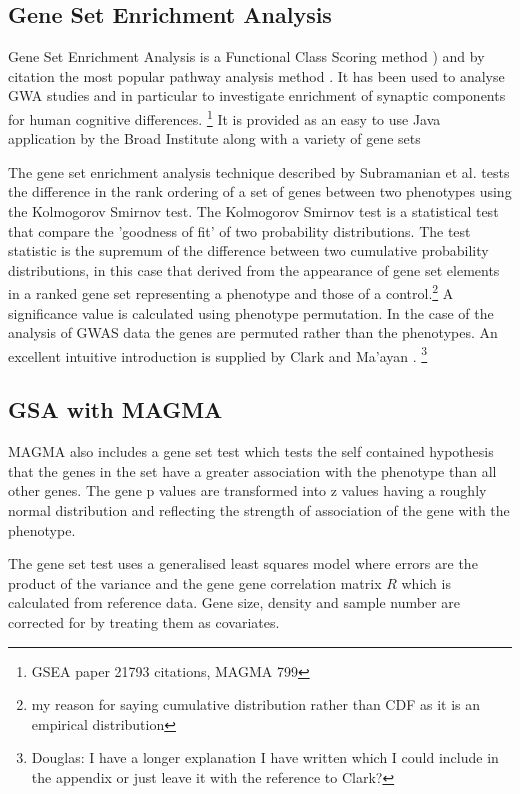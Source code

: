\subsection{Gene Set Enrichment Analysis}
\label{sec:Gene set enrichment analysis}
 Gene Set Enrichment Analysis is a Functional Class Scoring method \cite{subramanian2005gene}) and by citation the most popular pathway analysis method \parencite{zyla2017ranking}. It has been used to analyse GWA studies and in particular to investigate enrichment of synaptic components for human cognitive differences. \cite{hill2014human}\footnote{GSEA paper 21793 citations, MAGMA 799} It is provided as an easy to use Java application by the Broad Institute along with a variety of gene sets

The gene set enrichment analysis technique described by Subramanian et al. \cite{subramanian2005gene} tests the difference in the rank ordering of a set of genes between two phenotypes using the Kolmogorov Smirnov test. The Kolmogorov Smirnov test is a statistical test that compare the 'goodness of fit' of two probability distributions. The test statistic is the supremum of the difference between two cumulative probability distributions, in this case that derived from the appearance of gene set elements in a ranked gene set representing a phenotype and those of a control.\footnote{my reason for saying  cumulative distribution rather than CDF as it is an empirical distribution} A significance value is calculated using phenotype permutation. In the case of the analysis of GWAS data the genes are permuted rather than the phenotypes\cite{zyla2017ranking}. An excellent intuitive introduction is supplied by Clark and Ma'ayan \cite{clark2011introduction}. \footnote{Douglas: I have a longer explanation I have written which I could include in the appendix or just leave it with the reference to Clark?}

\subsection{GSA with MAGMA}
\label{sec:GSA MAGMA}
MAGMA also includes a gene set test which tests the self contained hypothesis that the genes in the set have a greater association with the phenotype than all other genes. The gene p values are transformed into z values having a roughly normal distribution and reflecting the strength of association of the gene with the phenotype. 

The gene set test uses a generalised least squares model where errors are the product of the variance and the gene gene correlation matrix $R$ which is calculated from reference data. Gene size, density and sample number are corrected for by treating them as covariates.

